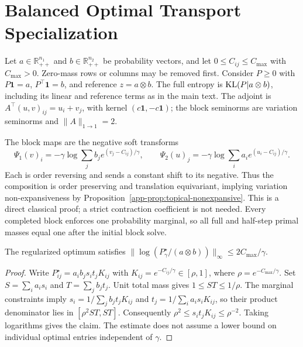 \section{Balanced Optimal Transport Specialization}\label{app-app:sinkhorn-ot}\label{app-subsec:sinkh-analysis}
Let $a\in\mathbb R_{++}^{n_1}$ and $b\in\mathbb R_{++}^{n_2}$ be probability vectors, and let $0\leq C_{ij}\leq C_{\max}$ with $C_{\max}>0$. Zero-mass rows or columns may be removed first. Consider $P\geq0$ with $P\mathbf1=a$, $P^\top\mathbf1=b$, and reference $z=a\otimes b$. The full entropy is $\mathrm{KL}(P|a\otimes b)$, including its linear and reference terms as in the main text. The adjoint is $A^\top(u,v)_{ij}=u_i+v_j$, with kernel $(c\mathbf1,-c\mathbf1)$; the block seminorms are variation seminorms and $\|A\|_{1\to1}=2$.

The block maps are the negative soft transforms
\begin{equation}\label{app-eq:soft-c-transform}
 \Psi_1(v)_i=-\gamma\log\sum_j b_j e^{(v_j-C_{ij})/\gamma},\qquad
 \Psi_2(u)_j=-\gamma\log\sum_i a_i e^{(u_i-C_{ij})/\gamma}.
\end{equation}
Each is order reversing and sends a constant shift to its negative. Thus the composition is order preserving and translation equivariant, implying variation non-expansiveness by Proposition~\ref{app-prop:topical-nonexpansive}. This is a direct classical proof; a strict contraction coefficient is not needed. Every completed block enforces one probability marginal, so all full and half-step primal masses equal one after the initial block solve.

\begin{proposition}\label{app-prop:hgamma-ot}
The regularized optimum satisfies $\|\log(P_\gamma^\star/(a\otimes b))\|_\infty\leq2C_{\max}/\gamma$.
\end{proposition}
\begin{proof}
Write $P_{ij}^\star=a_i b_j s_i t_j K_{ij}$ with $K_{ij}=e^{-C_{ij}/\gamma}\in[\rho,1]$, where $\rho=e^{-C_{\max}/\gamma}$. Set $S=\sum_i a_i s_i$ and $T=\sum_j b_j t_j$. Unit total mass gives $1\leq ST\leq1/\rho$. The marginal constraints imply $s_i=1/\sum_j b_jt_jK_{ij}$ and $t_j=1/\sum_i a_is_iK_{ij}$, so their product denominator lies in $[\rho^2ST,ST]$. Consequently $\rho^2\leq s_it_jK_{ij}\leq\rho^{-2}$. Taking logarithms gives the claim. The estimate does not assume a lower bound on individual optimal entries independent of $\gamma$.
\end{proof}

